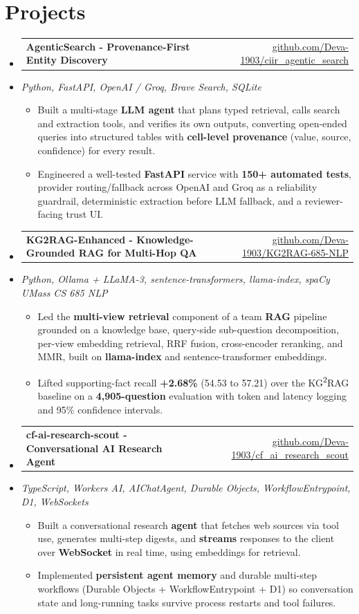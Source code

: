 \documentclass[letterpaper,10pt]{article}
\makeatletter
\newcommand{\resumeItem}[1]{
  \item\small{#1\vspace{-1pt}}
}
\newcommand{\resumeProjectHeading}[2]{
    \item
    \begin{tabular*}{0.985\textwidth}[t]{l@{\extracolsep{\fill}}r}
      \small\textbf{#1} & \small #2 \\
    \end{tabular*}\vspace{-5pt}
}
\newcommand{\resumeProjectSubheading}[1]{
  \vspace{-2pt}\item[] {\small\textcolor{ResumeSlate}{\emph{#1}}}\vspace{-3pt}
}
\newcommand{\resumeSubHeadingListStart}{\begin{itemize}[leftmargin=0.0in, label={}, itemsep=2pt, topsep=2pt]}
\newcommand{\resumeSubHeadingListEnd}{\end{itemize}}
\newcommand{\resumeItemListStart}{\begin{itemize}[leftmargin=0.18in, itemsep=2pt, topsep=1pt]}
\newcommand{\resumeItemListEnd}{\end{itemize}\vspace{-4pt}}
\makeatother
\begin{document}
\section{Projects}
\resumeSubHeadingListStart
  \resumeProjectHeading
    {AgenticSearch - Provenance-First Entity Discovery}
    {\href{https://github.com/Deva-1903/ciir_agentic_search}{github.com/Deva-1903/ciir\_agentic\_search}}
  \resumeProjectSubheading{Python, FastAPI, OpenAI / Groq, Brave Search, SQLite}
    \resumeItemListStart
      \resumeItem{Built a multi-stage \textbf{LLM agent} that plans typed retrieval, calls search and extraction tools, and verifies its own outputs, converting open-ended queries into structured tables with \textbf{cell-level provenance} (value, source, confidence) for every result.}
      \resumeItem{Engineered a well-tested \textbf{FastAPI} service with \textbf{150+ automated tests}, provider routing/fallback across OpenAI and Groq as a reliability guardrail, deterministic extraction before LLM fallback, and a reviewer-facing trust UI.}
    \resumeItemListEnd
  \resumeProjectHeading
    {KG2RAG-Enhanced - Knowledge-Grounded RAG for Multi-Hop QA}
    {\href{https://github.com/Deva-1903/KG2RAG-685-NLP}{github.com/Deva-1903/KG2RAG-685-NLP}}
  \resumeProjectSubheading{Python, Ollama + LLaMA-3, sentence-transformers, llama-index, spaCy \enspace\textbar\enspace UMass CS 685 NLP}
    \resumeItemListStart
      \resumeItem{Led the \textbf{multi-view retrieval} component of a team \textbf{RAG} pipeline grounded on a knowledge base, query-side sub-question decomposition, per-view embedding retrieval, RRF fusion, cross-encoder reranking, and MMR, built on \textbf{llama-index} and sentence-transformer embeddings.}
      \resumeItem{Lifted supporting-fact recall \textbf{+2.68\%} (54.53 to 57.21) over the KG\textsuperscript{2}RAG baseline on a \textbf{4{,}905-question} evaluation with token and latency logging and 95\% confidence intervals.}
    \resumeItemListEnd
  \resumeProjectHeading
    {cf-ai-research-scout - Conversational AI Research Agent}
    {\href{https://github.com/Deva-1903/cf_ai_research_scout}{github.com/Deva-1903/cf\_ai\_research\_scout}}
  \resumeProjectSubheading{TypeScript, Workers AI, AIChatAgent, Durable Objects, WorkflowEntrypoint, D1, WebSockets}
    \resumeItemListStart
      \resumeItem{Built a conversational research \textbf{agent} that fetches web sources via tool use, generates multi-step digests, and \textbf{streams} responses to the client over \textbf{WebSocket} in real time, using embeddings for retrieval.}
      \resumeItem{Implemented \textbf{persistent agent memory} and durable multi-step workflows (Durable Objects + WorkflowEntrypoint + D1) so conversation state and long-running tasks survive process restarts and tool failures.}
    \resumeItemListEnd
\resumeSubHeadingListEnd
\vspace{-4pt}
\end{document}
